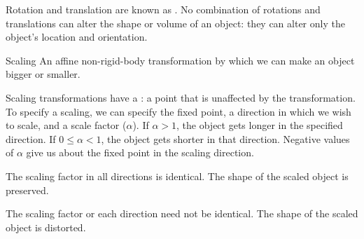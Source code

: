 \documentclass[../COS3712_Notes.tex]{subfiles}
\begin{document}
      Rotation and translation are known as .
      No combination of rotations and translations can alter the shape or volume of an object:
      they can alter only the object's location and orientation.

      \begin{definition}{Scaling}
        An affine non-rigid-body transformation by which we can make an object bigger or smaller.

        Scaling transformations have a : a point that is unaffected by the
        transformation.
        To specify a scaling, we can specify the fixed point, a direction in which we wish to scale,
        and a scale factor ($\alpha$).
        If $\alpha > 1$, the object gets longer in the specified direction.
        If $0 \leq \alpha < 1$, the object gets shorter in that direction.
        Negative values of $\alpha$ give us  about the fixed point
        in the scaling direction.
        \begin{descriptimize}
          \item[Uniform Scaling] The scaling factor in all directions is identical.
            The shape of the scaled object is preserved.
          \item[Non-uniform Scaling] The scaling factor or each direction need not be identical.
            The shape of the scaled object is distorted.
        \end{descriptimize}
      \end{definition}
\end{document}
